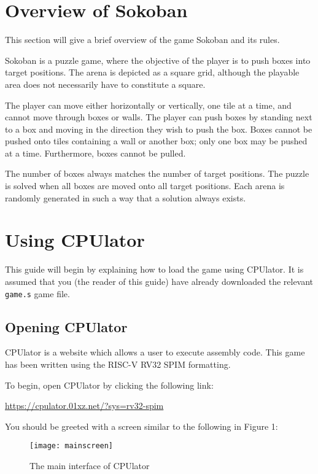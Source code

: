 \documentclass{article}
\begin{document}
\cover
\toc
{}


\newpage
\section{Overview of Sokoban}

This section will give a brief overview of the game Sokoban and its rules.

Sokoban is a puzzle game, where the objective of the player is to push boxes into target positions.
The arena is depicted as a square grid, although the playable area does not necessarily have to
constitute a square.

The player can move either horizontally or vertically, one tile at a time, and cannot move through
boxes or walls. The player can push boxes by standing next to a box and moving in the direction they
wish to push the box. Boxes cannot be pushed onto tiles containing a wall or another box; only one
box may be pushed at a time. Furthermore, boxes cannot be pulled.

The number of boxes always matches the number of target positions.
The puzzle is solved when all boxes are moved onto all target positions.
Each arena is randomly generated in such a way that a solution always exists.

\newpage
\section{Using CPUlator}

This guide will begin by explaining how to load the game using CPUlator.
It is assumed that you (the reader of this guide) have already downloaded
the relevant \texttt{game.s} game file.

\subsection{Opening CPUlator}

CPUlator is a website which allows a user to execute assembly code.
This game has been written using the RISC-V RV32 SPIM formatting.

To begin, open CPUlator by clicking the following link:
\begin{center}
    \href{https://cpulator.01xz.net/?sys=rv32-spim}{https://cpulator.01xz.net/?sys=rv32-spim}
\end{center}
You should be greeted with a screen similar to the following in Figure 1:
\begin{figure}[ht]
    \centering
    \texttt{[image: mainscreen]}
    \caption{The main interface of CPUlator}
\end{figure}
\end{document}
